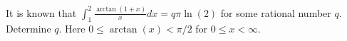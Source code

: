 It is known that $\displaystyle \int_1^2 \frac{\arctan(1+x)}{x} dx = q \pi
\ln(2)$ for some rational number $q$. Determine $q$. Here $0 \le \arctan(x) <
\pi/2$ for $0 \le x < \infty$.
